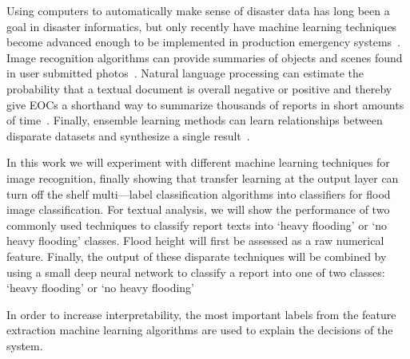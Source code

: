   Using computers to automatically make sense of disaster data has long
  been a goal in disaster informatics, but only recently have machine
  learning techniques become advanced enough to be implemented in production
  emergency systems~\cite{meierDigitalHumanitariansHow2015}. Image
  recognition algorithms can provide summaries of objects and scenes found
  in user submitted photos~\cite{nguyenRapidClassificationCrisisRelated,
  donahueDeCAFDeepConvolutional2013}. Natural language processing can
  estimate the probability that a textual document is overall negative or
  positive and thereby give EOCs a shorthand way to summarize thousands of
  reports in short amounts of
  time~\cite{nguyenRapidClassificationCrisisRelated,
  nagyCrowdSentimentDetection2012}. Finally, ensemble learning methods can
  learn relationships between disparate datasets and synthesize a single
  result~\cite{mouzannarDamageIdentificationSocial2018}.
  
  In this work we will experiment with different machine learning techniques
  for image recognition, finally showing that transfer learning at the 
  output layer can turn off the shelf multi---label  classification
  algorithms into classifiers for flood image classification. For textual analysis, 
  we will show the performance of two commonly used techniques to classify
  report texts into `heavy flooding' or `no heavy flooding' classes.  Flood
  height will first be assessed as a raw numerical feature. Finally, the output
  of these disparate techniques will be combined by using a small deep neural
  network to classify a report into one of two classes: `heavy flooding' or `no
  heavy flooding'

  In order to increase interpretability, the most important labels from
  the feature extraction machine learning algorithms are used to explain the
  decisions of the system.
